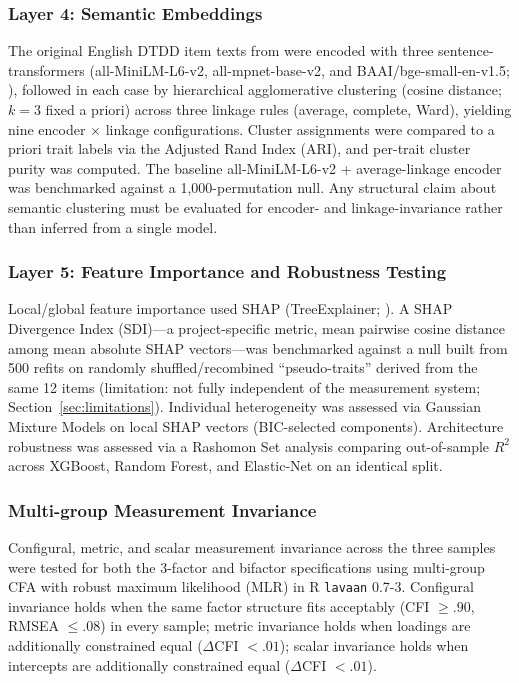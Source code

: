 \documentclass[11pt,twocolumn]{article}
\begin{document}
\subsubsection{Layer 4: Semantic Embeddings}

The original English DTDD item texts from \citet{jonason2010} were encoded with three sentence-transformers (all-MiniLM-L6-v2, all-mpnet-base-v2, and BAAI/bge-small-en-v1.5; \citealp{reimers2019}), followed in each case by hierarchical agglomerative clustering (cosine distance; $k=3$ fixed a priori) across three linkage rules (average, complete, Ward), yielding nine encoder $\times$ linkage configurations. Cluster assignments were compared to a priori trait labels via the Adjusted Rand Index (ARI), and per-trait cluster purity was computed. The baseline all-MiniLM-L6-v2 + average-linkage encoder was benchmarked against a 1,000-permutation null. Any structural claim about semantic clustering must be evaluated for encoder- and linkage-invariance rather than inferred from a single model.

\subsubsection{Layer 5: Feature Importance and Robustness Testing}

Local/global feature importance used SHAP (TreeExplainer; \citealp{lundberg2017}). A SHAP Divergence Index (SDI)---a project-specific metric, mean pairwise cosine distance among mean absolute SHAP vectors---was benchmarked against a null built from 500 refits on randomly shuffled/recombined ``pseudo-traits'' derived from the same 12 items (limitation: not fully independent of the measurement system; Section~\ref{sec:limitations}). Individual heterogeneity was assessed via Gaussian Mixture Models on local SHAP vectors (BIC-selected components). Architecture robustness was assessed via a Rashomon Set analysis \citep{fisher2019} comparing out-of-sample $R^2$ across XGBoost, Random Forest, and Elastic-Net on an identical split.

\subsubsection{Multi-group Measurement Invariance}

Configural, metric, and scalar measurement invariance across the three samples were tested for both the 3-factor and bifactor specifications using multi-group CFA with robust maximum likelihood (MLR) in R \texttt{lavaan} 0.7-3. Configural invariance holds when the same factor structure fits acceptably (CFI $\geq .90$, RMSEA $\leq .08$) in every sample; metric invariance holds when loadings are additionally constrained equal ($\Delta$CFI $< .01$); scalar invariance holds when intercepts are additionally constrained equal ($\Delta$CFI $< .01$).
\end{document}
